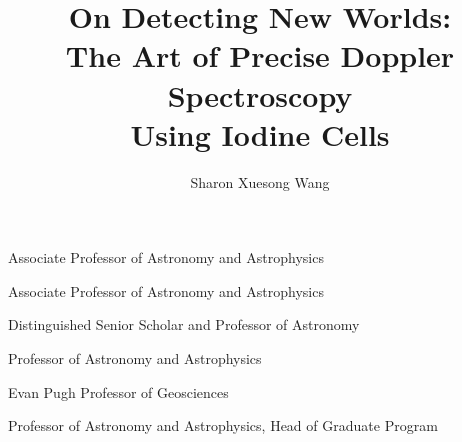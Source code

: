 \documentclass[11pt]{psuthesis}
\begin{document}
\title{On Detecting New Worlds: \\
  The Art of Precise Doppler Spectroscopy \\
  Using Iodine Cells}
\author{Sharon Xuesong Wang}


\begin{singlespace}

        {Associate Professor of Astronomy and Astrophysics}

          {Associate Professor of Astronomy and Astrophysics}

          {Distinguished Senior Scholar and Professor of Astronomy}

            {Professor of Astronomy and Astrophysics}

           {Evan Pugh Professor of Geosciences}

           {Professor of Astronomy and Astrophysics, Head of Graduate Program}

\begin{frontmatter}


\begin{doublespace}

\frontmatter
\psutitlepage
\psucommitteepage
{}
\thesistableofcontents
\thesislistoffigures
\thesislistoftables
\end{doublespace}


\clearpage
{}
\end{frontmatter}

\thesismainmatter
\allowdisplaybreaks{








}


\backmatter



\pagebreak
{}
\end{singlespace}
\end{document}

